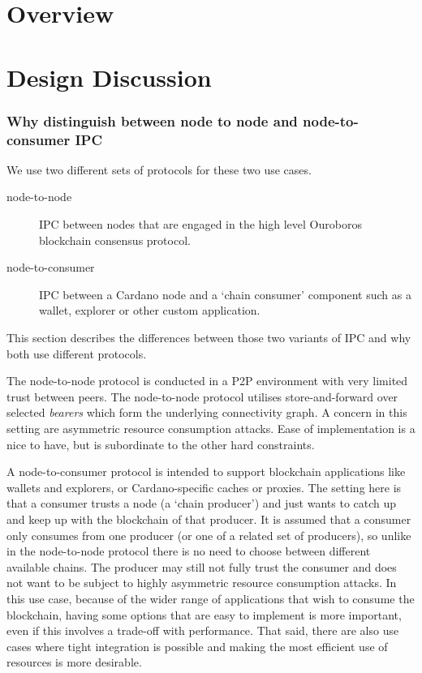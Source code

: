 \documentclass{report}
\theoremstyle{definition}{
  \newtheorem{lemma}{Lemma}[section] %
  \newtheorem{definition}[lemma]{Definition}
}
\theoremstyle{theorem}{
  \newtheorem{invariant}[lemma]{Invariant}
  \newtheorem{proofobligation}[lemma]{Proof Obligation}
}
\numberwithin{equation}{lemma}
\begin{document}
\section{Overview}
\section{Design Discussion}
\subsubsection{Why distinguish between node to node and node-to-consumer IPC}
\label{why_distinguish_protocols}
We use two different sets of protocols for these two use cases.

\begin{description}
\item[node-to-node] IPC between nodes that are engaged in the high level Ouroboros
      blockchain consensus protocol.
\item[node-to-consumer] IPC between a Cardano node and a `chain consumer' component such as a
      wallet, explorer or other custom application.
\end{description}

This section describes the differences between those two variants of IPC and why both use
different protocols.

The node-to-node protocol is conducted in a P2P environment
with very limited trust between peers. The node-to-node protocol utilises
store-and-forward over selected \emph{bearers} which form the underlying
connectivity graph. A concern in this setting are asymmetric resource
consumption attacks. Ease of implementation is a nice to have, but is
subordinate to the other hard constraints.

A node-to-consumer protocol is intended to support blockchain applications
like wallets and explorers, or Cardano-specific caches or proxies. The setting
here is that a consumer trusts a node (a `chain producer') and just wants to
catch up and keep up with the blockchain of that producer. It is assumed that
a consumer only consumes from one producer (or one of a related set of
producers), so unlike in the node-to-node protocol there is no need to choose
between different available chains. The producer may still not fully trust the
consumer and does not want to be subject to highly asymmetric resource
consumption attacks. In this use case, because of the wider range of
applications that wish to consume the blockchain, having some options that are
easy to implement is more important, even if this involves a trade-off with
performance. That said, there are also use cases where tight integration is
possible and making the most efficient use of resources is more desirable.
\end{document}
